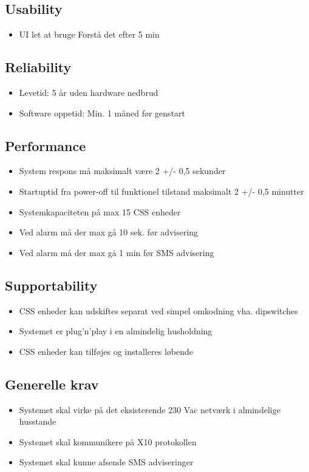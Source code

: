 \subsection*{Usability}
\begin{itemize}
\item UI let at bruge
\subitem Forstå det efter 5 min
\end{itemize}

\subsection*{Reliability}
\begin{itemize}
\item Levetid: 5 år uden hardware nedbrud
\item Software oppetid: Min. 1 måned før genstart
\end{itemize}

\subsection*{Performance}
\begin{itemize}
\item System respons må maksimalt være 2 +/- 0,5 sekunder
\item Startuptid fra power-off til funktionel tilstand maksimalt 2 +/- 0,5 minutter
\item Systemkapaciteten på max 15 CSS enheder
\item Ved alarm må der max gå 10 sek. før advisering
\item Ved alarm må der max gå 1 min før SMS advisering
\end{itemize}

\subsection*{Supportability}
\begin{itemize}
\item CSS enheder kan udskiftes separat ved simpel omkodning vha. dipswitches 
\item Systemet er plug’n’play i en almindelig husholdning
\item CSS enheder kan tilføjes og installeres løbende
\end{itemize}

\subsection*{Generelle krav}
\begin{itemize}
\item Systemet skal virke på det eksisterende 230 Vac netværk i almindelige husstande
\item Systemet skal kommunikere på X10 protokollen
\item Systemet skal kunne afsende SMS adviseringer
\end{itemize}

